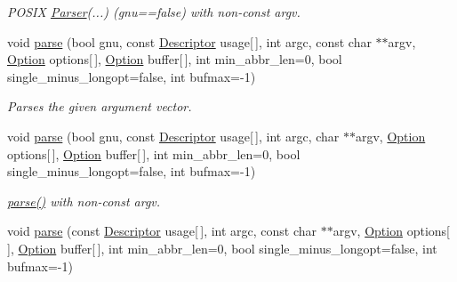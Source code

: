 \begin{DoxyCompactItemize}
\begin{DoxyCompactList}\small\item\em P\+O\+S\+I\+X \hyperlink{classxmem_1_1config_1_1third__party_1_1_parser}{Parser}(...) (gnu==false) with non-\/const argv. \end{DoxyCompactList}\item 
void \hyperlink{classxmem_1_1config_1_1third__party_1_1_parser_a0e45d97675bc5d003ef6f68ac8cd7249}{parse} (bool gnu, const \hyperlink{structxmem_1_1config_1_1third__party_1_1_descriptor}{Descriptor} usage\mbox{[}$\,$\mbox{]}, int argc, const char $\ast$$\ast$argv, \hyperlink{classxmem_1_1config_1_1third__party_1_1_option}{Option} options\mbox{[}$\,$\mbox{]}, \hyperlink{classxmem_1_1config_1_1third__party_1_1_option}{Option} buffer\mbox{[}$\,$\mbox{]}, int min\+\_\+abbr\+\_\+len=0, bool single\+\_\+minus\+\_\+longopt=false, int bufmax=-\/1)
\begin{DoxyCompactList}\small\item\em Parses the given argument vector. \end{DoxyCompactList}\item 
\hypertarget{classxmem_1_1config_1_1third__party_1_1_parser_ad6c978eb7ad107aa82dacab6980db8fa}{}void \hyperlink{classxmem_1_1config_1_1third__party_1_1_parser_ad6c978eb7ad107aa82dacab6980db8fa}{parse} (bool gnu, const \hyperlink{structxmem_1_1config_1_1third__party_1_1_descriptor}{Descriptor} usage\mbox{[}$\,$\mbox{]}, int argc, char $\ast$$\ast$argv, \hyperlink{classxmem_1_1config_1_1third__party_1_1_option}{Option} options\mbox{[}$\,$\mbox{]}, \hyperlink{classxmem_1_1config_1_1third__party_1_1_option}{Option} buffer\mbox{[}$\,$\mbox{]}, int min\+\_\+abbr\+\_\+len=0, bool single\+\_\+minus\+\_\+longopt=false, int bufmax=-\/1)\label{classxmem_1_1config_1_1third__party_1_1_parser_ad6c978eb7ad107aa82dacab6980db8fa}

\begin{DoxyCompactList}\small\item\em \hyperlink{classxmem_1_1config_1_1third__party_1_1_parser_a0e45d97675bc5d003ef6f68ac8cd7249}{parse()} with non-\/const argv. \end{DoxyCompactList}\item 
\hypertarget{classxmem_1_1config_1_1third__party_1_1_parser_aa80a5778fe3253dbfeae99ac47b20e5d}{}void \hyperlink{classxmem_1_1config_1_1third__party_1_1_parser_aa80a5778fe3253dbfeae99ac47b20e5d}{parse} (const \hyperlink{structxmem_1_1config_1_1third__party_1_1_descriptor}{Descriptor} usage\mbox{[}$\,$\mbox{]}, int argc, const char $\ast$$\ast$argv, \hyperlink{classxmem_1_1config_1_1third__party_1_1_option}{Option} options\mbox{[}$\,$\mbox{]}, \hyperlink{classxmem_1_1config_1_1third__party_1_1_option}{Option} buffer\mbox{[}$\,$\mbox{]}, int min\+\_\+abbr\+\_\+len=0, bool single\+\_\+minus\+\_\+longopt=false, int bufmax=-\/1)\label{classxmem_1_1config_1_1third__party_1_1_parser_aa80a5778fe3253dbfeae99ac47b20e5d}


\end{DoxyCompactItemize}
